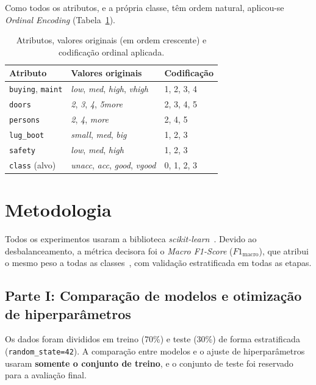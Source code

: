 \documentclass[11pt, a4paper]{article}
\begin{document}
Como todos os atributos, e a própria classe, têm ordem natural, aplicou-se \textit{Ordinal Encoding} (Tabela~\ref{tab:encoding}).

\begin{table}[htbp]
    \centering
    \caption{Atributos, valores originais (em ordem crescente) e codificação ordinal aplicada.}
    \label{tab:encoding}
    \begin{tabular}{lll}
        \toprule
        Atributo & Valores originais & Codificação \\
        \midrule
        \texttt{buying}, \texttt{maint} & \textit{low}, \textit{med}, \textit{high}, \textit{vhigh} & 1, 2, 3, 4 \\
        \texttt{doors}    & \textit{2}, \textit{3}, \textit{4}, \textit{5more} & 2, 3, 4, 5 \\
        \texttt{persons}  & \textit{2}, \textit{4}, \textit{more}              & 2, 4, 5 \\
        \texttt{lug\_boot} & \textit{small}, \textit{med}, \textit{big}        & 1, 2, 3 \\
        \texttt{safety}   & \textit{low}, \textit{med}, \textit{high}          & 1, 2, 3 \\
        \midrule
        \texttt{class} (alvo) & \textit{unacc}, \textit{acc}, \textit{good}, \textit{vgood} & 0, 1, 2, 3 \\
        \bottomrule
    \end{tabular}
\end{table}

\section{Metodologia}
\label{sec:metodologia}

Todos os experimentos usaram a biblioteca \textit{scikit-learn}~\cite{pedregosa2011}. Devido ao desbalanceamento, a métrica decisora foi o \textit{Macro F1-Score} ($F1_{\text{macro}}$), que atribui o mesmo peso a todas as classes~\cite{sokolova2009}, com validação estratificada em todas as etapas.

\subsection{Parte I: Comparação de modelos e otimização de hiperparâmetros}

Os dados foram divididos em treino (70\%) e teste (30\%) de forma estratificada (\texttt{random\_state=42}). A comparação entre modelos e o ajuste de hiperparâmetros usaram \textbf{somente o conjunto de treino}, e o conjunto de teste foi reservado para a avaliação final.
\end{document}
